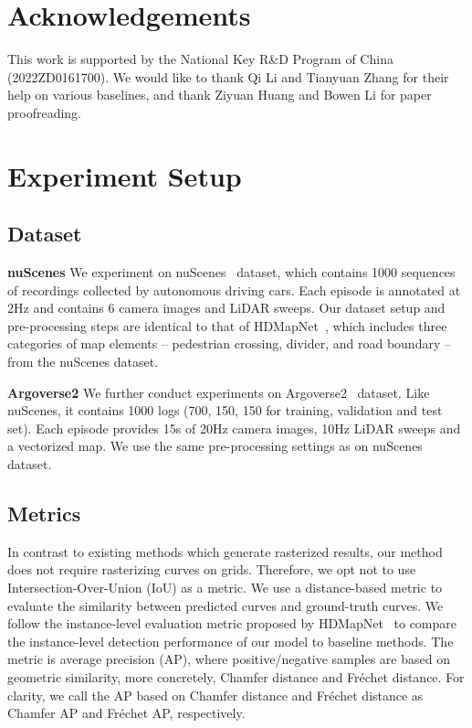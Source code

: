 \documentclass{article}
\theoremstyle{plain}
\theoremstyle{definition}
\theoremstyle{remark}
\begin{document}
\section*{Acknowledgements}
This work is supported by the National Key R\&D Program of China (2022ZD0161700). 
We would like to thank Qi Li and Tianyuan Zhang for their help on various baselines, and thank Ziyuan Huang and Bowen Li for paper proofreading.

\clearpage














\newpage
\appendix
\onecolumn


\label{Appendix}


\section{Experiment Setup}
\subsection{Dataset} 
\label{subsec:dataset}
\noindent\textbf{nuScenes}
We experiment on nuScenes~\citep{caesar2020nuscenes} dataset, which contains 1000 sequences of recordings collected by autonomous driving cars. Each episode is annotated at 2Hz and contains 6 camera images and LiDAR sweeps. 
Our dataset setup and pre-processing steps are identical to that of HDMapNet~\citep{li2021hdmapnet}, which includes three categories of map elements -- pedestrian crossing, divider, and road boundary -- from the nuScenes dataset.

\noindent\textbf{Argoverse2}
We further conduct experiments on Argoverse2~\citep{Argoverse2} dataset. Like nuScenes, it contains 1000 logs (700, 150, 150 for training, validation and test set). Each episode provides 15s of 20Hz camera images, 10Hz LiDAR sweeps and a vectorized map. We use the same pre-processing settings as on nuScenes dataset.


\subsection{Metrics}
\label{sec:metric}
In contrast to existing methods which generate rasterized results, our method does not require rasterizing curves on grids. Therefore, we opt not to use Intersection-Over-Union (IoU) as a metric. We use a distance-based metric to evaluate the similarity between predicted curves and ground-truth curves. 
We follow the instance-level evaluation metric proposed by HDMapNet~\citep{li2021hdmapnet} to compare the instance-level detection performance of our model to baseline methods.
The metric is average precision (AP), where positive/negative samples are based on geometric similarity, more concretely, Chamfer distance and Fr\'echet distance. For clarity, we call the AP based on Chamfer distance and Fr\'echet distance as Chamfer AP and Fr\'echet AP, respectively.
\end{document}
